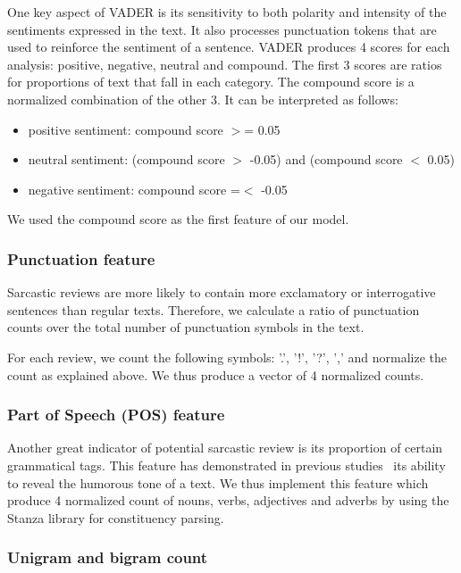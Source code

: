 \documentclass[10pt,twocolumn,letterpaper]{article}
\begin{document}
One key aspect of VADER is its sensitivity to both polarity and intensity of the sentiments expressed in the text.
It also processes punctuation tokens that are used to reinforce the sentiment of a sentence.
VADER produces 4 scores for each analysis: positive, negative, neutral and compound.
The first 3 scores are ratios for proportions of text that fall in each category. The compound score is a normalized combination of the other 3.
It can be interpreted as follows:

\begin{itemize}
    \item positive sentiment: compound score $>$= 0.05
    \item neutral sentiment: (compound score $>$ -0.05) and (compound score $<$ 0.05)
    \item negative sentiment: compound score =$<$ -0.05
\end{itemize}

We used the compound score as the first feature of our model.

\subsubsection{Punctuation feature}

Sarcastic reviews are more likely to contain more exclamatory or interrogative sentences than regular texts.
Therefore, we calculate a ratio of punctuation counts over the total number of punctuation symbols in the text.

For each review, we count the following symbols: '.', '!', '?', ',' and normalize the count as explained above.
We thus produce a vector of 4 normalized counts.

\subsubsection{Part of Speech (POS) feature}

Another great indicator of potential sarcastic review is its proportion of certain grammatical tags.
This feature has demonstrated in previous studies~\cite{jain2019} its ability to reveal the humorous tone of a text.
We thus implement this feature which produce 4 normalized count of nouns, verbs, adjectives and adverbs by using the Stanza library for constituency parsing.

\subsubsection{Unigram and bigram count}
\end{document}
